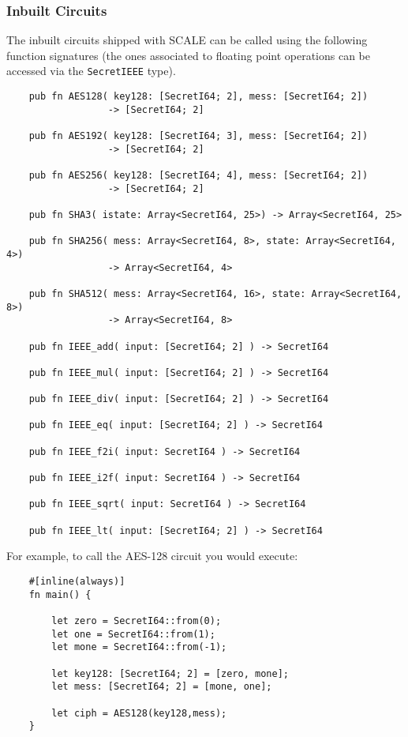 \subsubsection{Inbuilt Circuits}
The inbuilt circuits shipped with SCALE can be called using the
following function signatures (the ones associated to floating point
operations can be accessed via the \verb|SecretIEEE| type).
\begin{lstlisting}
    pub fn AES128( key128: [SecretI64; 2], mess: [SecretI64; 2]) 
                  -> [SecretI64; 2]

    pub fn AES192( key128: [SecretI64; 3], mess: [SecretI64; 2]) 
                  -> [SecretI64; 2]

    pub fn AES256( key128: [SecretI64; 4], mess: [SecretI64; 2]) 
                  -> [SecretI64; 2]

    pub fn SHA3( istate: Array<SecretI64, 25>) -> Array<SecretI64, 25>

    pub fn SHA256( mess: Array<SecretI64, 8>, state: Array<SecretI64, 4>) 
                  -> Array<SecretI64, 4>

    pub fn SHA512( mess: Array<SecretI64, 16>, state: Array<SecretI64, 8>) 
                  -> Array<SecretI64, 8>

    pub fn IEEE_add( input: [SecretI64; 2] ) -> SecretI64

    pub fn IEEE_mul( input: [SecretI64; 2] ) -> SecretI64

    pub fn IEEE_div( input: [SecretI64; 2] ) -> SecretI64

    pub fn IEEE_eq( input: [SecretI64; 2] ) -> SecretI64

    pub fn IEEE_f2i( input: SecretI64 ) -> SecretI64

    pub fn IEEE_i2f( input: SecretI64 ) -> SecretI64

    pub fn IEEE_sqrt( input: SecretI64 ) -> SecretI64

    pub fn IEEE_lt( input: [SecretI64; 2] ) -> SecretI64
\end{lstlisting}
For example, to call the AES-128 circuit you would execute:
\begin{lstlisting}
    #[inline(always)]
    fn main() {

        let zero = SecretI64::from(0);
        let one = SecretI64::from(1);
        let mone = SecretI64::from(-1);
    
        let key128: [SecretI64; 2] = [zero, mone];
        let mess: [SecretI64; 2] = [mone, one];
    
        let ciph = AES128(key128,mess);
    }
\end{lstlisting}



